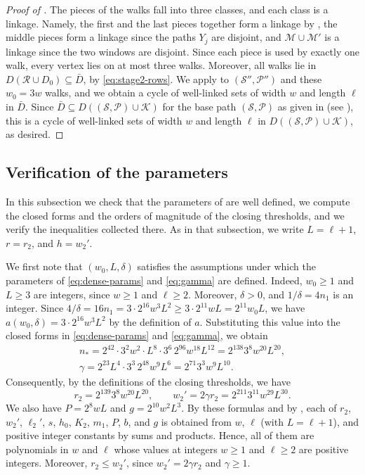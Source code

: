 \documentclass[fontsize=12pt,leading=14pt]{fullpaper}
\newcommand{\Kcal}{\mathcal{K}}
\newcommand{\Mcal}{\mathcal{M}}
\newcommand{\Pcal}{\mathcal{P}}
\newcommand{\Rcal}{\mathcal{R}}
\newcommand{\Scal}{\mathcal{S}}
\begin{document}
\begin{proof}[Proof of ]
  The pieces of the walks fall into three classes, and each class is a linkage.
  Namely, the first and the last pieces together form a linkage by , the middle pieces form a linkage since the paths $Y_j$ are disjoint, and $\Mcal\cup\Mcal'$ is a linkage since the two windows are disjoint.
  Since each piece is used by exactly one walk, every vertex lies on at most three walks.
  Moreover, all walks lie in $D(\Rcal\cup D_0)\subseteq\bar D$, by \eqref{eq:stage2-rows}.
  We apply  to $(\Scal'',\Pcal'')$ and these $w_0=3w$ walks, and we obtain a cycle of well-linked sets of width $w$ and length $\ell$ in $\bar D$.
  Since $\bar D\subseteq D((\Scal,\Pcal)\cup\Kcal)$ for the base path $(\Scal,\Pcal)$ as given in  (see ), this is a cycle of well-linked sets of width $w$ and length $\ell$ in $D((\Scal,\Pcal)\cup\Kcal)$, as desired.
\end{proof}
\subsection{Verification of the parameters}\label{sec:stage2-check}

In this subsection we check that the parameters of  are well defined, we compute the closed forms and the orders of magnitude of the closing thresholds, and we verify the inequalities collected there.
As in that subsection, we write $L=\ell+1$, $r=r_2$, and $h=w_2'$.

We first note that $(w_0,L,\delta)$ satisfies the assumptions under which the parameters of \eqref{eq:dense-params} and \eqref{eq:gamma} are defined.
Indeed, $w_0\ge1$ and $L\ge3$ are integers, since $w\ge1$ and $\ell\ge2$.
Moreover, $\delta>0$, and $1/\delta=4n_1$ is an integer.
Since $4/\delta=16n_1=3\cdot2^{16}w^3L^2\ge3\cdot2^{11}wL=2^{11}w_0L$, we have $a(w_0,\delta)=3\cdot2^{16}w^3L^2$ by the definition of $a$.
Substituting this value into the closed forms in \eqref{eq:dense-params} and \eqref{eq:gamma}, we obtain
\begin{gather*}
  n_*=2^{42}\cdot3^2w^2\cdot L^8\cdot3^6\,2^{96}w^{18}L^{12}=2^{138}3^8w^{20}L^{20},\\
  \gamma=2^{23}L^4\cdot3^3\,2^{48}w^9L^6=2^{71}3^3w^9L^{10}.
\end{gather*}
Consequently, by the definitions of the closing thresholds, we have
\begin{equation}\label{eq:stage2-closed}
  r_2=2^{139}3^8w^{20}L^{20},\qquad w_2'=2\gamma r_2=2^{211}3^{11}w^{29}L^{30}.
\end{equation}
We also have $P=2^8wL$ and $g=2^{10}w^2L^3$.
By these formulas and by , each of $r_2$, $w_2'$, $\ell_2'$, $s$, $h_0$, $K_2$, $m_1$, $P$, $b$, and $g$ is obtained from $w$, $\ell$ (with $L=\ell+1$), and positive integer constants by sums and products.
Hence, all of them are polynomials in $w$ and $\ell$ whose values at integers $w\ge1$ and $\ell\ge2$ are positive integers.
Moreover, $r_2\le w_2'$, since $w_2'=2\gamma r_2$ and $\gamma\ge1$.
\end{document}
